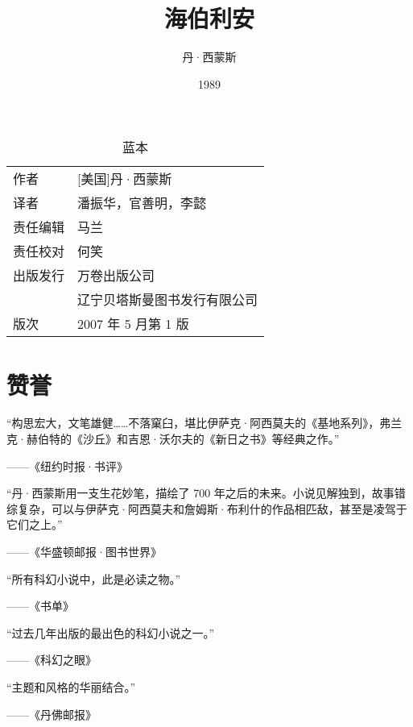 \documentclass[AutoFakeBold=true]{book}
\title{海伯利安}
\author{丹·西蒙斯}
\date{1989}
\newenvironment{abstract}{}{}
\begin{document}
\maketitle
\pagestyle{empty}

\renewcommand{\abstractname}{}
\begin{abstract}
	\begin{table}[]
		\begin{center}
			\caption{蓝本}
			\begin{tabular}{ll}
				{\heiti 作者} & [美国]丹·西蒙斯\\
				{\heiti 译者} & 潘振华，官善明，李懿\\
				{\heiti 责任编辑} & 马兰\\
				{\heiti 责任校对} & 何笑\\
				{\heiti 出版发行} & 万卷出版公司\\&辽宁贝塔斯曼图书发行有限公司\\
				{\heiti 版次} & 2007 年 5 月第 1 版\\
			\end{tabular}
		\end{center}
	\end{table}
\end{abstract}

\section*{赞誉}

``构思宏大，文笔雄健……不落窠臼，堪比伊萨克·阿西莫夫的《基地系列》，弗兰克·赫伯特的《沙丘》和吉恩·沃尔夫的《新日之书》等经典之作。''\begin{flushright}——《纽约时报·书评》\end{flushright}

``丹·西蒙斯用一支生花妙笔，描绘了 700 年之后的未来。小说见解独到，故事错综复杂，可以与伊萨克·阿西莫夫和詹姆斯·布利什的作品相匹敌，甚至是凌驾于它们之上。''\begin{flushright}——《华盛顿邮报·图书世界》\end{flushright}

``所有科幻小说中，此是必读之物。''\begin{flushright}——《书单》\end{flushright}

``过去几年出版的最出色的科幻小说之一。''\begin{flushright}——《科幻之眼》\end{flushright}

``主题和风格的华丽结合。''\begin{flushright}——《丹佛邮报》\end{flushright}
\end{document}
